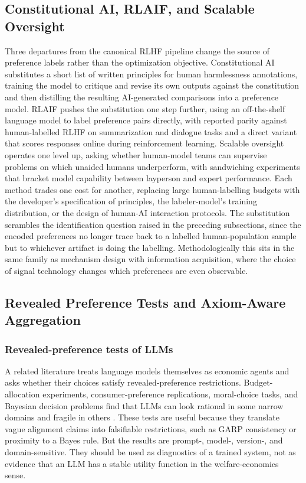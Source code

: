 \subsection{Constitutional AI, RLAIF, and Scalable Oversight}

Three departures from the canonical RLHF pipeline change the source of preference labels rather than the optimization objective. Constitutional AI \citep{bai2022constitutional} substitutes a short list of written principles for human harmlessness annotations, training the model to critique and revise its own outputs against the constitution and then distilling the resulting AI-generated comparisons into a preference model. RLAIF \citep{lee2023rlaif} pushes the substitution one step further, using an off-the-shelf language model to label preference pairs directly, with reported parity against human-labelled RLHF on summarization and dialogue tasks and a direct variant that scores responses online during reinforcement learning. Scalable oversight \citep{bowman2022oversight} operates one level up, asking whether human-model teams can supervise problems on which unaided humans underperform, with sandwiching experiments that bracket model capability between layperson and expert performance. Each method trades one cost for another, replacing large human-labelling budgets with the developer's specification of principles, the labeler-model's training distribution, or the design of human-AI interaction protocols. The substitution scrambles the identification question raised in the preceding subsections, since the encoded preferences no longer trace back to a labelled human-population sample but to whichever artifact is doing the labelling. Methodologically this sits in the same family as mechanism design with information acquisition, where the choice of signal technology changes which preferences are even observable.

\subsection{Revealed Preference Tests and Axiom-Aware Aggregation}
\label{sec:revealed_pref_axioms}

\subsubsection{Revealed-preference tests of LLMs}

A related literature treats language models themselves as economic agents and asks whether their choices satisfy revealed-preference restrictions. Budget-allocation experiments, consumer-preference replications, moral-choice tasks, and Bayesian decision problems find that LLMs can look rational in some narrow domains and fragile in others \citep{chen2023rationalitygpt,golisingh2024preferences,seror2024moral,murawatrawat2025bayesian}. These tests are useful because they translate vague alignment claims into falsifiable restrictions, such as GARP consistency or proximity to a Bayes rule. But the results are prompt-, model-, version-, and domain-sensitive. They should be used as diagnostics of a trained system, not as evidence that an LLM has a stable utility function in the welfare-economics sense.

